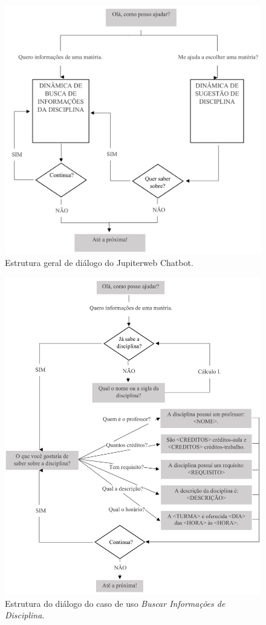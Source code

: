 \documentclass[]{politex}
\begin{document}
\begin{figure}[h]
    \centering
    \includegraphics[width=1\textwidth]{images/anexo/asm-general.png}
    \caption{Estrutura geral de diálogo do Jupiterweb Chatbot.}
    \label{fig:asm_general}
\end{figure}

\begin{figure}[h]
    \centering
    \includegraphics[width=1\textwidth]{images/anexo/asm-query.png}
    \caption{Estrutura do diálogo do caso de uso \textit{Buscar Informações de Disciplina}.}
    \label{fig:asm_query}
\end{figure}
\end{document}
